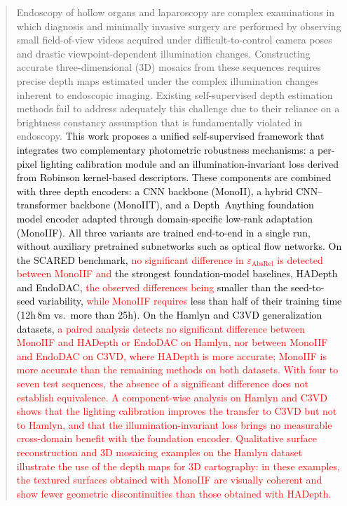 \documentclass[a4paper,fleqn]{cas-dc}
\begin{document}
\maketitle
\begin{abstract}
%
Endoscopy of hollow organs and laparoscopy are complex examinations 
in which diagnosis and minimally invasive surgery are performed by observing small field-of-view videos acquired under difficult-to-control camera poses and drastic viewpoint-dependent illumination changes.  Constructing accurate three-dimensional (3D) mosaics from these sequences requires precise depth maps estimated under the complex illumination changes inherent to endoscopic imaging.  Existing self-supervised depth estimation methods fail to address adequately this challenge due to their reliance on a brightness constancy assumption that is fundamentally violated in endoscopy. \textcolor{black}{This work proposes a unified self-supervised framework that integrates two complementary photometric robustness mechanisms: a per-pixel lighting calibration module and an illumination-invariant loss derived from Robinson kernel-based descriptors. These components are combined with three depth encoders: a CNN backbone (MonoII), a hybrid CNN--transformer backbone (MonoIIT), and a Depth~Anything foundation model encoder adapted through domain-specific low-rank adaptation (MonoIIF). All three variants are trained end-to-end in a single run, without auxiliary pretrained subnetworks such as optical flow networks. On the SCARED benchmark, \textcolor{red}{no significant difference in $\varepsilon_\textrm{AbsRel}$ is detected between MonoIIF and} the strongest foundation-model baselines, HADepth and EndoDAC, \textcolor{red}{the observed differences being} smaller than the seed-to-seed variability, \textcolor{red}{while MonoIIF requires} less than half of their training time (12h\,8m vs.\ more than 25h). On the Hamlyn and C3VD generalization datasets, \textcolor{red}{a paired analysis detects no significant difference between MonoIIF and HADepth or EndoDAC on Hamlyn, nor between MonoIIF and EndoDAC on C3VD, where HADepth is more accurate; MonoIIF is more accurate than the remaining methods on both datasets. With four to seven test sequences, the absence of a significant difference does not establish equivalence.} \textcolor{red}{A component-wise analysis on Hamlyn and C3VD shows that the lighting calibration improves the transfer to C3VD but not to Hamlyn, and that the illumination-invariant loss brings no measurable cross-domain benefit with the foundation encoder.} \textcolor{red}{Qualitative surface reconstruction and 3D mosaicing examples on the Hamlyn dataset illustrate the use of the depth maps for 3D cartography: in these examples, the textured surfaces obtained with MonoIIF are visually coherent and show fewer geometric discontinuities than those obtained with HADepth.}}
\end{abstract}
\end{document}
